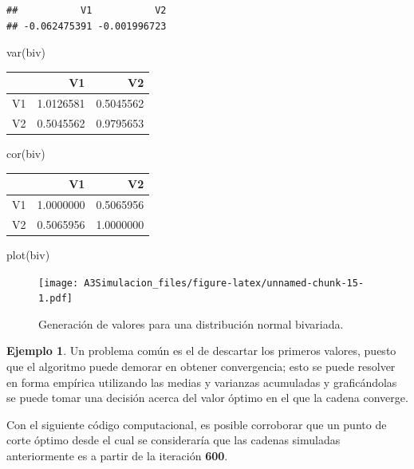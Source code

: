 \documentclass[
  10pt,
  spanish,
]{book}
\newenvironment{Shaded}{\begin{snugshade}}{\end{snugshade}}
\newcommand{\FunctionTok}[1]{\textcolor[rgb]{0.00,0.00,0.00}{#1}}
\newcommand{\NormalTok}[1]{#1}
\theoremstyle{definition}
\theoremstyle{definition}
\newtheorem{example}{Ejemplo}[chapter]
\theoremstyle{definition}
\theoremstyle{definition}
\theoremstyle{remark}
\begin{document}
\begin{verbatim}
##           V1           V2 
## -0.062475391 -0.001996723
\end{verbatim}

\begin{Shaded}
\begin{Highlighting}[]
\FunctionTok{var}\NormalTok{(biv)}
\end{Highlighting}
\end{Shaded}

\begin{tabular}{l|r|r}
\hline
  & V1 & V2\\
\hline
V1 & 1.0126581 & 0.5045562\\
\hline
V2 & 0.5045562 & 0.9795653\\
\hline
\end{tabular}

\begin{Shaded}
\begin{Highlighting}[]
\FunctionTok{cor}\NormalTok{(biv)}
\end{Highlighting}
\end{Shaded}

\begin{tabular}{l|r|r}
\hline
  & V1 & V2\\
\hline
V1 & 1.0000000 & 0.5065956\\
\hline
V2 & 0.5065956 & 1.0000000\\
\hline
\end{tabular}

\begin{Shaded}
\begin{Highlighting}[]
\FunctionTok{plot}\NormalTok{(biv)}
\end{Highlighting}
\end{Shaded}

\begin{figure}
\centering
\texttt{[image: A3Simulacion\_files/figure-latex/unnamed-chunk-15-1.pdf]}
\caption{\label{fig:unnamed-chunk-15}Generación de valores para una distribución normal bivariada.}
\end{figure}

\begin{example}
\protect\hypertarget{exm:unnamed-chunk-16}{}{\label{exm:unnamed-chunk-16} }Un problema común es el de descartar los primeros valores, puesto que el algoritmo puede demorar en obtener convergencia;
esto se puede resolver en forma empírica utilizando las medias y varianzas acumuladas y graficándolas se puede tomar una decisión acerca del valor óptimo en el que la cadena converge.

Con el siguiente código computacional, es posible corroborar que un punto de corte óptimo desde el cual se consideraría que las cadenas simuladas anteriormente es a partir de la iteración \textbf{600}.
\end{example}
\end{document}
